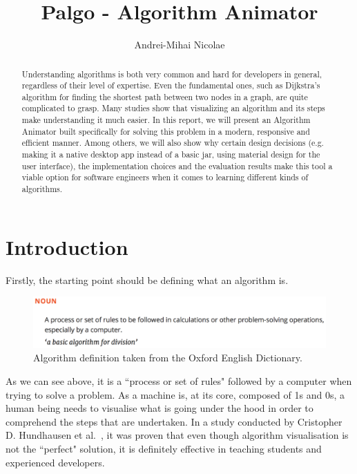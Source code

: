 \documentclass{l4proj}
\begin{document}
\title{Palgo - Algorithm Animator}
\author{Andrei-Mihai Nicolae}
\maketitle

\begin{abstract}
Understanding algorithms is both very common and hard for developers in general,
regardless of their level of expertise. Even the fundamental ones, such as Dijkstra's algorithm
for finding the shortest path between two nodes in a graph, are quite complicated to grasp. Many
studies show that visualizing an algorithm and its steps make understanding it much easier. In
this report, we will present an Algorithm Animator built specifically for solving this problem
in a modern, responsive and efficient manner. Among others, we will also show why certain design decisions (e.g. making it a native
desktop app instead of a basic jar, using material design for the user interface), the implementation choices and the
evaluation results make this tool a viable option for software engineers when it comes to learning different kinds of
algorithms.
\end{abstract}

\educationalconsent

\tableofcontents
\chapter{Introduction}
\label{intro}

Firstly, the starting point should be defining what an algorithm is.

\begin{figure}[!ht]
\centering
\includegraphics[scale=0.5]{algorithm}
\caption{Algorithm definition taken from the Oxford English Dictionary.}
\label{fig:algorithm}
\end{figure}

As we can see above, it is a ``process or set of rules" followed by a computer when trying to solve a problem. As a
machine is, at its core, composed of 1s and 0s, a human being needs to visualise what is going under the hood in order
to comprehend the steps that are undertaken. In a study conducted by Cristopher D. Hundhausen et al.~\cite{av}, it was
proven that even though algorithm visualisation is not the ``perfect" solution, it is definitely effective in teaching students and experienced developers.
\end{document}
